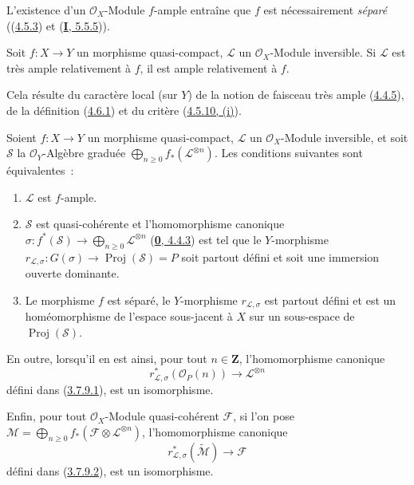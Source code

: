 L'existence d'un $\mathcal{O}_X$-Module $f$-ample entraîne que $f$ est
nécessairement \emph{séparé} ((\hyperref[II.4.5.3-fr]{4.5.3}) et
(\hyperref[I.5.5.5-fr]{\textbf{I}, 5.5.5})).

\begin{proposition}[4.6.2]
\label{II.4.6.2-fr}
Soit $f:X\to Y$ un morphisme quasi-compact, $\mathcal{L}$ un
$\mathcal{O}_X$-Module inversible. Si $\mathcal{L}$ est très ample
relativement à $f$, il est ample relativement à $f$.
\end{proposition}

Cela résulte du caractère local (sur $Y$) de la notion de faisceau très
ample (\hyperref[II.4.4.5-fr]{4.4.5}), de la définition
(\hyperref[II.4.6.1-fr]{4.6.1}) et du critère
(\hyperref[II.4.5.10-fr]{4.5.10, (i)}).

\begin{proposition}[4.6.3]
\label{II.4.6.3-fr}
Soient $f:X\to Y$ un morphisme quasi-compact, $\mathcal{L}$ un
$\mathcal{O}_X$-Module inversible, et soit $\mathcal{S}$ la
$\mathcal{O}_Y$-Algèbre graduée
$\bigoplus_{n\geq0}f_*(\mathcal{L}^{\otimes n})$. Les conditions suivantes
sont équivalentes~:
\begin{enumerate}
  \item[\rm{a)}] $\mathcal{L}$ est $f$-ample.
  \item[\rm{b)}] $\mathcal{S}$ est quasi-cohérente et l'homomorphisme
  canonique $\sigma:f^*(\mathcal{S})\to
  \bigoplus_{n\geq0}\mathcal{L}^{\otimes n}$
  \textup{(\hyperref[0.4.4.3-fr]{\textbf{0}, 4.4.3})} est tel que le $Y$-morphisme
  $r_{\mathcal{L},\sigma}:G(\sigma)\to\operatorname{Proj}(\mathcal{S})=P$
  soit partout défini et soit une immersion ouverte dominante.
  \item[\rm{b')}] Le morphisme $f$ est séparé, le $Y$-morphisme
  $r_{\mathcal{L},\sigma}$ est partout défini et est un homéomorphisme de
  l'espace sous-jacent à $X$ sur un sous-espace de
  $\operatorname{Proj}(\mathcal{S})$.
\end{enumerate}
En outre, lorsqu'il en est ainsi, pour tout $n\in\mathbf{Z}$,
l'homomorphisme canonique
\begin{equation}
\label{II.4.6.3.1-fr}
  r_{\mathcal{L},\sigma}^*(\mathcal{O}_P(n))
  \longrightarrow\mathcal{L}^{\otimes n}
\tag{4.6.3.1}
\end{equation}
défini dans \textup{(\hyperref[II.3.7.9.1-fr]{3.7.9.1})}, est un isomorphisme.

Enfin, pour tout $\mathcal{O}_X$-Module quasi-cohérent $\mathcal{F}$, si
l'on pose
$\mathcal{M}=\bigoplus_{n\geq0}f_*(\mathcal{F}\otimes
\mathcal{L}^{\otimes n})$, l'homomorphisme canonique
\begin{equation}
\label{II.4.6.3.2-fr}
  r_{\mathcal{L},\sigma}^*(\widetilde{\mathcal{M}})
  \longrightarrow\mathcal{F}
\tag{4.6.3.2}
\end{equation}
défini dans \textup{(\hyperref[II.3.7.9.2-fr]{3.7.9.2})}, est un isomorphisme.
\end{proposition}


